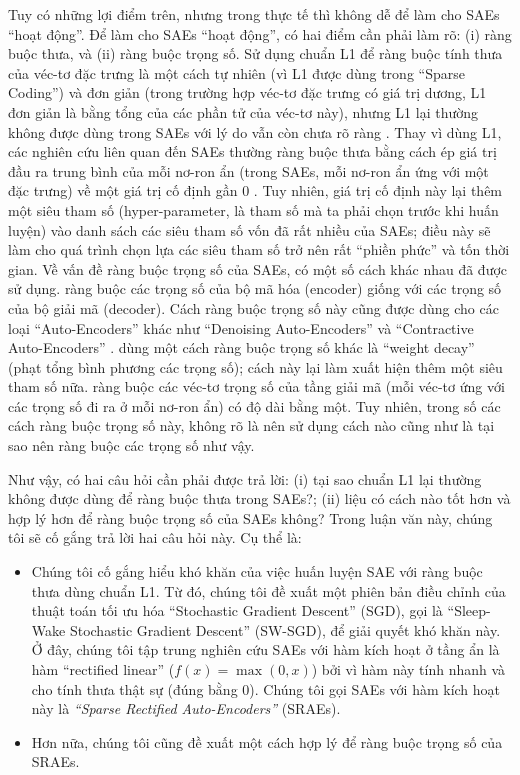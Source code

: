 Tuy có những lợi điểm trên, nhưng trong thực tế thì không dễ để làm cho SAEs ``hoạt động''. Để làm cho SAEs ``hoạt động'', có hai điểm cần phải làm rõ: (i) ràng buộc thưa, và (ii) ràng buộc trọng số. Sử dụng chuẩn L1 để ràng buộc tính thưa của véc-tơ đặc trưng là một cách tự nhiên (vì L1 được dùng trong ``Sparse Coding'') và đơn giản (trong trường hợp véc-tơ đặc trưng có giá trị dương, L1 đơn giản là bằng tổng của các phần tử của véc-tơ này), nhưng L1 lại thường không được dùng trong SAEs với lý do vẫn còn chưa rõ ràng \cite{bengio2013representation}. Thay vì dùng L1, các nghiên cứu liên quan đến SAEs thường ràng buộc thưa bằng cách ép giá trị đầu ra trung bình của mỗi nơ-ron ẩn (trong SAEs, mỗi nơ-ron ẩn ứng với một đặc trưng) về một giá trị cố định gần 0 \cite{goodfellow2009measuring}\cite{coates2011analysis}\cite{coates2012demystifying}. Tuy nhiên, giá trị cố định này lại thêm một siêu tham số (hyper-parameter, là tham số mà ta phải chọn trước khi huấn luyện) vào danh sách các siêu tham số vốn đã rất nhiều của SAEs; điều này sẽ làm cho quá trình chọn lựa các siêu tham số trở nên rất ``phiền phức'' và tốn thời gian. Về vấn đề ràng buộc trọng số của SAEs, có một số cách khác nhau đã được sử dụng. \cite{coates2012demystifying} ràng buộc các trọng số của bộ mã hóa (encoder) giống với các trọng số của bộ giải mã (decoder). Cách ràng buộc trọng số này cũng được dùng cho các loại ``Auto-Encoders'' khác như ``Denoising Auto-Encoders'' \cite{vincent2008extracting} và ``Contractive Auto-Encoders'' \cite{rifai2011contractive}\cite{rifai2011HCAEs}. \cite{goodfellow2009measuring}\cite{coates2011analysis} dùng một cách ràng buộc trọng số khác là ``weight decay'' (phạt tổng bình phương các trọng số); cách này lại làm xuất hiện thêm một siêu tham số nữa. \cite{zeiler2013rectified} ràng buộc các véc-tơ trọng số của tầng giải mã (mỗi véc-tơ ứng với các trọng số đi ra ở mỗi nơ-ron ẩn) có độ dài bằng một. Tuy nhiên, trong số các cách ràng buộc trọng số này, không rõ là nên sử dụng cách nào cũng như là tại sao nên ràng buộc các trọng số như vậy.

Như vậy, có hai câu hỏi cần phải được trả lời: (i) tại sao chuẩn L1 lại thường không được dùng để ràng buộc thưa trong SAEs?; (ii) liệu có cách nào tốt hơn và hợp lý hơn để ràng buộc trọng số của SAEs không? Trong luận văn này, chúng tôi sẽ cố gắng trả lời hai câu hỏi này. Cụ thể là:
\begin{itemize}
	\item Chúng tôi cố gắng hiểu khó khăn của việc huấn luyện SAE với ràng buộc thưa dùng chuẩn L1. Từ đó, chúng tôi đề xuất một phiên bản điều chỉnh của thuật toán tối ưu hóa ``Stochastic Gradient Descent'' (SGD), gọi là ``Sleep-Wake Stochastic Gradient Descent'' (SW-SGD), để giải quyết khó khăn này. Ở đây, chúng tôi tập trung nghiên cứu SAEs với hàm kích hoạt ở tầng ẩn là hàm ``rectified linear'' ($f(x) = \max(0, x)$) bởi vì hàm này tính nhanh và cho tính thưa thật sự (đúng bằng 0). Chúng tôi gọi SAEs với hàm kích hoạt này là \emph{``Sparse Rectified Auto-Encoders''} (SRAEs).
	\item Hơn nữa, chúng tôi cũng đề xuất một cách hợp lý để ràng buộc trọng số của SRAEs.
\end{itemize}

